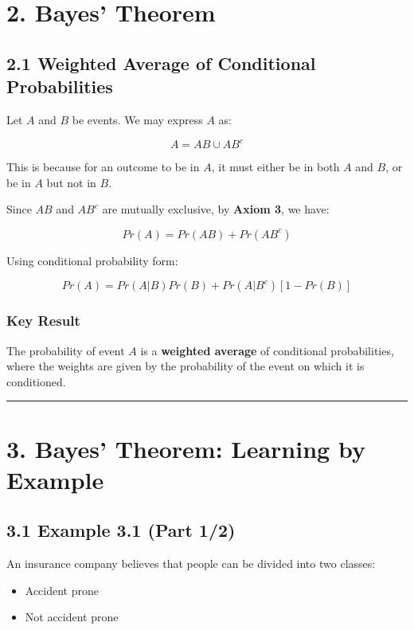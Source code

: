 \documentclass[12pt]{article}
\begin{document}
\section*{\textbf{2. Bayes’ Theorem}}

\subsection*{\textbf{2.1 Weighted Average of Conditional Probabilities}}

Let $A$ and $B$ be events. We may express $A$ as:

\[
A = AB \cup AB^c
\]

This is because for an outcome to be in $A$, it must either be in both $A$ and $B$, or be in $A$ but not in $B$.

Since $AB$ and $AB^c$ are mutually exclusive, by \textbf{Axiom 3}, we have:

\[
Pr(A) = Pr(AB) + Pr(AB^c)
\]

Using conditional probability form:

\[
Pr(A) = Pr(A|B)Pr(B) + Pr(A|B^c)[1 - Pr(B)]
\]

\subsubsection*{\textbf{Key Result}}

The probability of event $A$ is a \textbf{weighted average} of conditional probabilities, where the weights are given by the probability of the event on which it is conditioned.

\hrule
\vspace{1em}

\section*{\textbf{3. Bayes’ Theorem: Learning by Example}}

\subsection*{\textbf{3.1 Example 3.1 (Part 1/2)}}

An insurance company believes that people can be divided into two classes:

\begin{itemize}
    \item Accident prone
    \item Not accident prone
\end{itemize}
\end{document}
